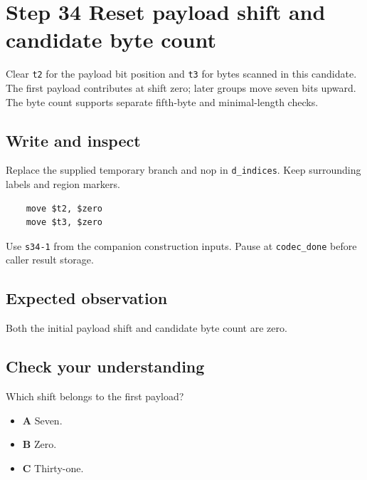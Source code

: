\section{Step 34 Reset payload shift and candidate byte count}\label{delta-s34}

Clear \texttt{t2} for the payload bit position and \texttt{t3} for bytes scanned in this candidate. The first payload contributes at shift zero; later groups move seven bits upward. The byte count supports separate fifth-byte and minimal-length checks.

\subsection{Write and inspect}
Replace the supplied temporary branch and nop in \texttt{d\_indices}. Keep surrounding labels and region markers.

\begin{verbatim}
    move $t2, $zero
    move $t3, $zero
\end{verbatim}
Use \texttt{s34-1} from the companion construction inputs. Pause at \texttt{codec\_done} before caller result storage.

\subsection{Expected observation}
Both the initial payload shift and candidate byte count are zero.

\subsection{Check your understanding}
Which shift belongs to the first payload?

\begin{itemize}
  \item \textbf{A} Seven.
  \item \textbf{B} Zero.
  \item \textbf{C} Thirty-one.
\end{itemize}
